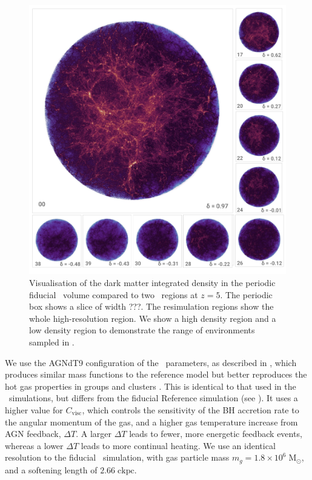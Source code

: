 \begin{figure}
  \includegraphics[width=\textwidth]{images/flares_regions.pdf}
  \caption{Visualisation of the dark matter integrated density in the periodic fiducial \eagle\ volume compared to two \flares\ regions at $z = 5$.
	The periodic box shows a slice of width ???.
	The resimulation regions show the whole high-resolution region.
	We show a high density region and a low density region to demonstrate the range of environments sampled in \flares.
	}
  \label{fig:sm_vis}
\end{figure}


We use the AGNdT9 configuration of the \eagle\ parameters, as described in \citet{schaye_eagle_2015}, which produces similar mass functions to the reference model but better reproduces the hot gas properties in groups and clusters \citep{barnes_cluster-eagle_2017}.
This is identical to that used in the \ceagle\ simulations, but differs from the fiducial Reference simulation (see ).
It uses a higher value for $C_{\mathrm{visc}}$, which controls the sensitivity of the BH accretion rate to the angular momentum of the gas, and a higher gas temperature increase from AGN feedback, $\Delta T$.
A larger $\Delta T$ leads to fewer, more energetic feedback events, whereas a lower $\Delta T$ leads to more continual heating.
We use an identical resolution to the fiducial \eagle\ simulation, with gas particle mass $m_{g} = 1.8 \times 10^6 \; \mathrm{M_{\odot}}$, and a softening length of $2.66 \; \mathrm{ckpc}$.

